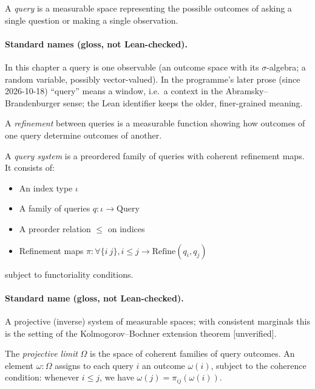 \begin{definition}
\label{def:query}
\leanok
A \emph{query} is a measurable space representing the possible outcomes of asking a single question or making a single observation.
\end{definition}

\paragraph{Standard names (gloss, not Lean-checked).} In this chapter a query is
one observable (an outcome space with its $\sigma$-algebra; a random variable,
possibly vector-valued). In the programme's later prose (since 2026-10-18)
``query'' means a window, i.e.\ a context in the Abramsky--Brandenburger sense;
the Lean identifier keeps the older, finer-grained meaning.

\begin{definition}
\label{def:refine}
\leanok
A \emph{refinement} between queries is a measurable function showing how outcomes of one query determine outcomes of another.
\end{definition}

\begin{definition}
\label{def:query-system}
\leanok
{}
A \emph{query system} is a preordered family of queries with coherent refinement maps. It consists of:
\begin{itemize}
\item An index type $\iota$
\item A family of queries $q : \iota \to \text{Query}$
\item A preorder relation $\le$ on indices
\item Refinement maps $\pi : \forall \{i\ j\}, i \le j \to \text{Refine}(q_i, q_j)$
\end{itemize}
subject to functoriality conditions.
\end{definition}

\paragraph{Standard name (gloss, not Lean-checked).} A projective (inverse)
system of measurable spaces; with consistent marginals this is the setting of
the Kolmogorov--Bochner extension theorem [unverified].

\begin{definition}
\label{def:omega}
\leanok
The \emph{projective limit} $\Omega$ is the space of coherent families of query outcomes.
An element $\omega : \Omega$ assigns to each query $i$ an outcome $\omega(i)$, subject to the coherence condition:
whenever $i \le j$, we have $\omega(j) = \pi_{ij}(\omega(i))$.
\end{definition}

